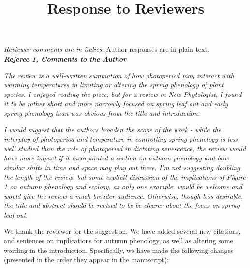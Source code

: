 \documentclass{article}
\begin{document}
\setlength\parindent{0pt}

\title{Response to Reviewers}
\emph{Reviewer comments are in italics.} Author responses are in plain text.\\

\emph{{\bf Referee 1, Comments to the Author}}

\par \emph{The review is a well-written summation of how photoperiod may interact with warming temperatures in limiting or altering the spring phenology of plant species. I enjoyed reading the piece, but for a review in New Phytologist, I found it to be rather short and more narrowly focused on spring leaf out and early spring phenology than was obvious from the title and introduction.}

\par \emph{I would suggest that the authors broaden the scope of the work - while the interplay of photoperiod and temperature in controlling spring phenology is less well studied than the role of photoperiod in dictating senescence, the review would have more impact if it incorporated a section on autumn phenology and how similar shifts in time and space may play out there. I'm not suggesting doubling the length of the review, but some explicit discussion of the implications of Figure 1 on autumn phenology and ecology, as only one example, would be welcome and would give the review a much broader audience. Otherwise, though less desirable, the title and abstract should be revised to be be clearer about the focus on spring leaf out.}
\par We thank the reviewer for the suggestion. We have added several new citations, and sentences on implications for autumn phenology, as well as altering some wording in the introduction. Specifically, we have made the following changes (presented in the order they appear in the manuscript):
\end{document}
